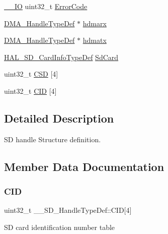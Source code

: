 \begin{DoxyCompactItemize}
\item 
\mbox{\hyperlink{core__sc300_8h_aec43007d9998a0a0e01faede4133d6be}{\+\_\+\+\_\+\+IO}} uint32\+\_\+t \mbox{\hyperlink{struct_____s_d___handle_type_def_a21c46b0a3536288c77afb861424703a5}{Error\+Code}}
\item 
\mbox{\hyperlink{group___d_m_a___exported___types_ga41b754a906b86bce54dc79938970138b}{D\+M\+A\+\_\+\+Handle\+Type\+Def}} $\ast$ \mbox{\hyperlink{struct_____s_d___handle_type_def_a7f4585e7d490fe8eeba54208c4a85d0e}{hdmarx}}
\item 
\mbox{\hyperlink{group___d_m_a___exported___types_ga41b754a906b86bce54dc79938970138b}{D\+M\+A\+\_\+\+Handle\+Type\+Def}} $\ast$ \mbox{\hyperlink{struct_____s_d___handle_type_def_a7ab5c4b29409b890bf2ecb7f4c45316a}{hdmatx}}
\item 
\mbox{\hyperlink{struct_h_a_l___s_d___card_info_type_def}{H\+A\+L\+\_\+\+S\+D\+\_\+\+Card\+Info\+Type\+Def}} \mbox{\hyperlink{struct_____s_d___handle_type_def_acc1bca0ed12ca05deb5b8187acfe08ee}{Sd\+Card}}
\item 
uint32\+\_\+t \mbox{\hyperlink{struct_____s_d___handle_type_def_a8179bd0b4432d5ebd135dcbbfecfab7a}{C\+SD}} \mbox{[}4\mbox{]}
\item 
uint32\+\_\+t \mbox{\hyperlink{struct_____s_d___handle_type_def_a44f623d2e7fc9af6337239d8f7ecd7a9}{C\+ID}} \mbox{[}4\mbox{]}
\end{DoxyCompactItemize}


\subsection{Detailed Description}
SD handle Structure definition. 

\subsection{Member Data Documentation}
\mbox{\label{struct_____s_d___handle_type_def_a44f623d2e7fc9af6337239d8f7ecd7a9}} 
\subsubsection{\texorpdfstring{CID}{CID}}
{\footnotesize\ttfamily uint32\+\_\+t \+\_\+\+\_\+\+S\+D\+\_\+\+Handle\+Type\+Def\+::\+C\+ID\mbox{[}4\mbox{]}}

SD card identification number table \mbox{\label{struct_____s_d___handle_type_def_ad2fce54d0cd2a5b1d07e26407128d9c3}} 
